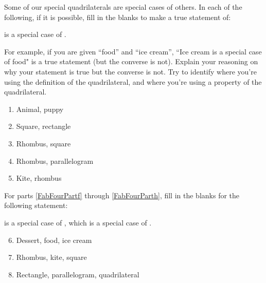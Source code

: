 \documentclass[handout]{ximera}
\begin{document}
\begin{problem}
Some of our special quadrilaterals are special cases of others.  In each of the following, if it is possible, fill in the blanks to make a true statement of:

\begin{center} \underline{\hspace{1in}} is a special case of \underline{\hspace{1in}}. \end{center}

For example, if you are given ``food'' and ``ice cream'', ``Ice cream is a special case of food" is a true statement (but the converse is not).  Explain your reasoning on why your statement is true but the converse is not.  Try to identify where you're using the definition of the quadrilateral, and where you're using a property of the quadrilateral.
\begin{enumerate}
\item  Animal, puppy
\item  Square, rectangle
\item Rhombus, square
\item  Rhombus, parallelogram
\item  Kite, rhombus
\end{enumerate}

For parts \ref{FabFourPartf} through \ref{FabFourParth}, fill in the blanks for the following statement:

\begin{center} \underline{\hspace{0.5in}} is a special case of \underline{\hspace{0.5in}}, which is a special case of \underline{\hspace{0.5in}}. \end{center}

\begin{enumerate}
\setcounter{enumi}{5}
    \item Dessert, food, ice cream \label{FabFourPartf}
    \item  Rhombus, kite, square
    \item Rectangle, parallelogram, quadrilateral \label{FabFourParth}
\end{enumerate}



\end{problem}
\end{document}
